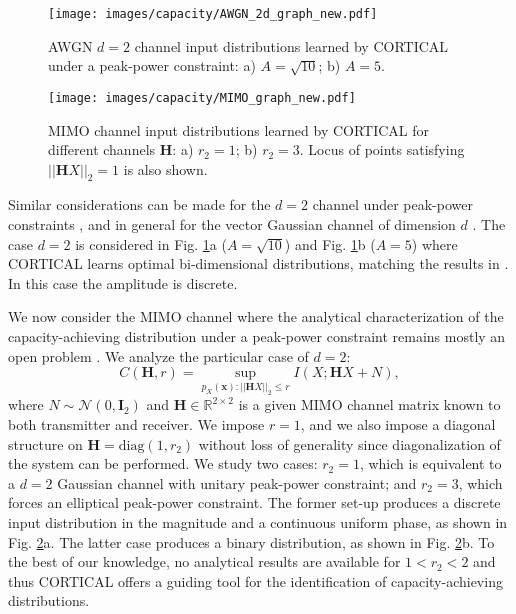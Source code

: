 \begin{figure}
	\centering
	\texttt{[image: images/capacity/AWGN\_2d\_graph\_new.pdf]}
	\caption{AWGN $d=2$ channel input distributions learned by CORTICAL under a peak-power constraint: a) $A=\sqrt{10}$; b) $A=5$.}
	\label{fig:CORTICAL_heatmaps}
\end{figure} 

\begin{figure}
	\centering
	\texttt{[image: images/capacity/MIMO\_graph\_new.pdf]}
	\caption{MIMO channel input distributions learned by CORTICAL for different channels $\mathbf{H}$: a) $r_2=1$; b) $r_2=3$. Locus of points satisfying $||\mathbf{H}X||_2= 1$ is also shown.}
	\label{fig:CORTICAL_MIMO}
\end{figure} 
Similar considerations can be made for the $d=2$ channel under peak-power constraints \cite{Rassouli2016}, and in general for the vector Gaussian channel of dimension $d$ \cite{Dytso2019}. 
The case $d=2$ is considered in Fig. \ref{fig:CORTICAL_heatmaps}a ($A=\sqrt{10}$) and Fig. \ref{fig:CORTICAL_heatmaps}b ($A=5$) where CORTICAL learns optimal bi-dimensional distributions, matching the results in \cite{Rassouli2016}. In this case the amplitude is discrete. 

We now consider the MIMO channel where the analytical characterization of the capacity-achieving distribution under a peak-power constraint remains mostly an open problem \cite{Dytso2019-MIMO}. We analyze the particular case of $d=2$: 
\begin{equation}
C(\mathbf{H},r) = \sup_{p_{X}(\mathbf{x}): ||\mathbf{H}X||_2\leq r} I(X;\mathbf{H}X+N),
\end{equation}
where $N \sim \mathcal{N}(0,\mathbf{I}_2)$ and $\mathbf{H} \in \mathbb{R}^{2\times 2}$ is a given MIMO channel matrix known to both transmitter and receiver. We impose $r=1$, and we also impose a diagonal structure on $\mathbf{H}=\text{diag}(1,r_2)$ without loss of generality since diagonalization of the system can be performed. We study two cases: $r_2 = 1$, which is equivalent to a $d=2$ Gaussian channel with unitary peak-power constraint; and $r_2=3$, which forces an elliptical peak-power constraint. The former set-up produces a discrete input distribution in the magnitude and a continuous uniform phase, as shown in Fig. \ref{fig:CORTICAL_MIMO}a. The latter case produces a binary distribution, as shown in Fig. \ref{fig:CORTICAL_MIMO}b. To the best of our knowledge, no analytical results are available for $1<r_2<2$ and thus CORTICAL offers a guiding tool for the identification of capacity-achieving distributions. 


